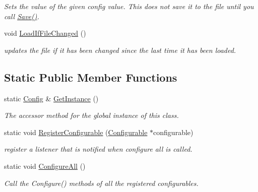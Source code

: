 \begin{DoxyCompactItemize}
\begin{DoxyCompactList}\small\item\em \-Sets the value of the given config value. \-This does not save it to the file until you call \hyperlink{class_config_ab04c51d227c1457404ae9dadc1c576e1}{\-Save()}. \end{DoxyCompactList}\item 
\hypertarget{class_config_abf94809be52a00ca26d982d10db3cfbc}{
void \hyperlink{class_config_abf94809be52a00ca26d982d10db3cfbc}{\-Load\-If\-File\-Changed} ()}
\label{class_config_abf94809be52a00ca26d982d10db3cfbc}

\begin{DoxyCompactList}\small\item\em updates the file if it has been changed since the last time it has been loaded. \end{DoxyCompactList}\end{DoxyCompactItemize}
\subsection*{\-Static \-Public \-Member \-Functions}
\begin{DoxyCompactItemize}
\item 
\hypertarget{class_config_a8d16346252818f578e1232bab86cdaef}{
static \hyperlink{class_config}{\-Config} \& \hyperlink{class_config_a8d16346252818f578e1232bab86cdaef}{\-Get\-Instance} ()}
\label{class_config_a8d16346252818f578e1232bab86cdaef}

\begin{DoxyCompactList}\small\item\em \-The accessor method for the global instance of this class. \end{DoxyCompactList}\item 
\hypertarget{class_config_ac9bb425d0132c84317e9e3528dbf97fb}{
static void \hyperlink{class_config_ac9bb425d0132c84317e9e3528dbf97fb}{\-Register\-Configurable} (\hyperlink{class_configurable}{\-Configurable} $\ast$configurable)}
\label{class_config_ac9bb425d0132c84317e9e3528dbf97fb}

\begin{DoxyCompactList}\small\item\em register a listener that is notified when configure all is called. \end{DoxyCompactList}\item 
\hypertarget{class_config_a93caf01e5a4e8adaef68802ce13161be}{
static void \hyperlink{class_config_a93caf01e5a4e8adaef68802ce13161be}{\-Configure\-All} ()}
\label{class_config_a93caf01e5a4e8adaef68802ce13161be}

\begin{DoxyCompactList}\small\item\em \-Call the \-Configure() methods of all the registered configurables. \end{DoxyCompactList}\end{DoxyCompactItemize}

